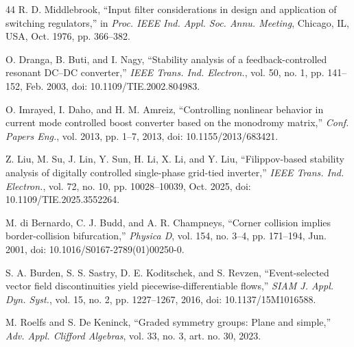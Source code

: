 \documentclass[journal]{IEEEtran}
\begin{document}
\begin{thebibliography}{44}
 R. D. Middlebrook, ``Input filter considerations
in design and application of switching regulators,'' in \emph{Proc. IEEE
Ind. Appl. Soc. Annu. Meeting}, Chicago, IL, USA, Oct. 1976, pp. 366--382.

 O. Dranga, B. Buti, and I. Nagy, ``Stability
analysis of a feedback-controlled resonant DC--DC converter,'' \emph{IEEE
Trans. Ind. Electron.}, vol. 50, no. 1, pp. 141--152, Feb. 2003,
doi: 10.1109/TIE.2002.804983.

 O. Imrayed, I. Daho, and H. M. Amreiz,
``Controlling nonlinear behavior in current mode controlled boost converter
based on the monodromy matrix,'' \emph{Conf. Papers Eng.}, vol. 2013,
pp. 1--7, 2013, doi: 10.1155/2013/683421.

 Z. Liu, M. Su, J. Lin, Y. Sun, H. Li, X. Li, and
Y. Liu, ``Filippov-based stability analysis of digitally controlled
single-phase grid-tied inverter,'' \emph{IEEE Trans. Ind. Electron.},
vol. 72, no. 10, pp. 10028--10039, Oct. 2025, doi: 10.1109/TIE.2025.3552264.

 M. di Bernardo, C. J. Budd, and
A. R. Champneys, ``Corner collision implies border-collision bifurcation,''
\emph{Physica D}, vol. 154, no. 3--4, pp. 171--194, Jun. 2001,
doi: 10.1016/S0167-2789(01)00250-0.

 S. A. Burden, S. S. Sastry, D. E. Koditschek, and
S. Revzen, ``Event-selected vector field discontinuities yield
piecewise-differentiable flows,'' \emph{SIAM J. Appl. Dyn. Syst.}, vol. 15,
no. 2, pp. 1227--1267, 2016, doi: 10.1137/15M1016588.

 M. Roelfs and S. De Keninck, ``Graded symmetry
groups: Plane and simple,'' \emph{Adv. Appl. Clifford Algebras}, vol. 33,
no. 3, art. no. 30, 2023.

\end{thebibliography}
\end{document}
